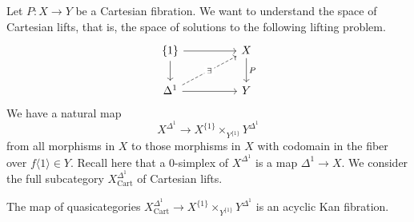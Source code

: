 Let $P:X\to Y$ be a Cartesian fibration. We want to understand the space of Cartesian lifts, that is, the space of solutions to the following lifting problem. 
$$%
\begin{tikzcd}
	{\{1\}} && X \\
	{\Delta^{1}} && Y
	\arrow["P", from=1-3, to=2-3]
	\arrow[from=1-1, to=1-3]
	\arrow[from=2-1, to=2-3]
	\arrow[from=1-1, to=2-1]
	\arrow["\exists"{description}, dashed, from=2-1, to=1-3]
\end{tikzcd}$$
We have a natural map 
$$X^{\Delta^{1}}\to X^{\{1\}}\times_{Y^{\{1\}}}Y^{\Delta^{1}}$$
from all morphisms in $X$ to those morphisms in $X$ with codomain in the fiber over $f\langle 1\rangle\in Y$. Recall here that a 0-simplex of $X^{\Delta^{1}}$ is a map $\Delta^{1}\to X$. We consider the full subcategory $X_{\mathrm{Cart}}^{\Delta^{1}}$ of Cartesian lifts. 
\begin{proposition}\label{prop: X Delta 1 Cart to fiber is acyclic Kan}
    The map of quasicategories $X^{\Delta^{1}}_{\mathrm{Cart}}\to X^{\{1\}}\times_{Y^{\{1\}}}Y^{\Delta^{1}}$ is an acyclic Kan fibration. 
\end{proposition}
